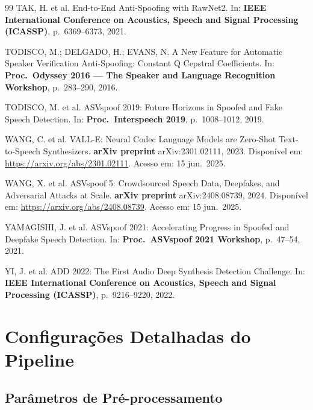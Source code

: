 \documentclass[12pt,a4paper]{article}
\begin{document}
\begin{thebibliography}{99}
TAK, H. et al.
End-to-End Anti-Spoofing with RawNet2.
In: \textbf{IEEE International Conference on Acoustics, Speech and Signal
Processing (ICASSP)}, p.~6369--6373, 2021.

TODISCO, M.; DELGADO, H.; EVANS, N.
A New Feature for Automatic Speaker Verification Anti-Spoofing:
Constant Q Cepstral Coefficients.
In: \textbf{Proc.\ Odyssey 2016 --- The Speaker and Language Recognition
Workshop}, p.~283--290, 2016.

TODISCO, M. et al.
ASVspoof 2019: Future Horizons in Spoofed and Fake Speech Detection.
In: \textbf{Proc.\ Interspeech 2019}, p.~1008--1012, 2019.

WANG, C. et al.
VALL-E: Neural Codec Language Models are Zero-Shot Text-to-Speech Synthesizers.
\textbf{arXiv preprint} arXiv:2301.02111, 2023.
Dispon\'{i}vel em: \url{https://arxiv.org/abs/2301.02111}.
Acesso em: 15 jun.\ 2025.

WANG, X. et al.
ASVspoof 5: Crowdsourced Speech Data, Deepfakes, and Adversarial Attacks at
Scale.
\textbf{arXiv preprint} arXiv:2408.08739, 2024.
Dispon\'{i}vel em: \url{https://arxiv.org/abs/2408.08739}.
Acesso em: 15 jun.\ 2025.

YAMAGISHI, J. et al.
ASVspoof 2021: Accelerating Progress in Spoofed and Deepfake Speech Detection.
In: \textbf{Proc.\ ASVspoof 2021 Workshop}, p.~47--54, 2021.

YI, J. et al.
ADD 2022: The First Audio Deep Synthesis Detection Challenge.
In: \textbf{IEEE International Conference on Acoustics, Speech and Signal
Processing (ICASSP)}, p.~9216--9220, 2022.

\end{thebibliography}

\appendix

\section{Configura\c{c}\~{o}es Detalhadas do Pipeline}

\subsection{Par\^{a}metros de Pr\'{e}-processamento}
\end{document}
